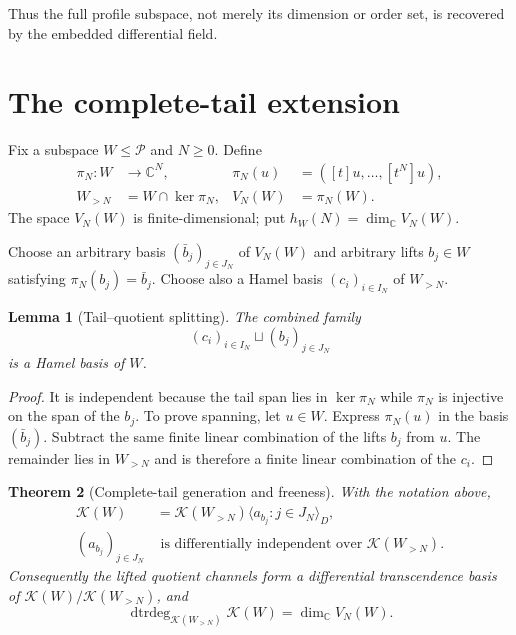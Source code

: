 \documentclass[11pt]{article}
\newtheorem{theorem}{Theorem}[section]
\newtheorem{lemma}[theorem]{Lemma}
\theoremstyle{definition}
\theoremstyle{remark}
\newcommand{\C}{\mathbb C}
\newcommand{\Pcal}{\mathcal P}
\newcommand{\K}{\mathcal K}
\newcommand{\dtrdeg}{\operatorname{dtrdeg}}
\begin{document}
Thus the full profile subspace, not merely its dimension or order set, is recovered by the embedded
differential field.

\section{The complete-tail extension}\label{sec:tail}

Fix a subspace $W\le\Pcal$ and $N\ge0$.  Define
\begin{align}
 \pi_N:W&\longrightarrow\C^N,
 &\pi_N(u)&=([t]u,\ldots,[t^N]u),                         \label{eq:prefix-map}\\
 W_{>N}&=W\cap\ker\pi_N,
 &V_N(W)&=\pi_N(W).                                      \label{eq:tail-space}
\end{align}
The space $V_N(W)$ is finite-dimensional; put $h_W(N)=\dim_\C V_N(W)$.

Choose an arbitrary basis $(\bar b_j)_{j\in J_N}$ of $V_N(W)$ and arbitrary lifts
$b_j\in W$ satisfying $\pi_N(b_j)=\bar b_j$.  Choose also a Hamel basis $(c_i)_{i\in I_N}$ of
$W_{>N}$.

\begin{lemma}[Tail--quotient splitting]\label{lem:tail-splitting}
The combined family
\begin{equation}\label{eq:combined-basis}
 (c_i)_{i\in I_N}\sqcup(b_j)_{j\in J_N}
\end{equation}
is a Hamel basis of $W$.
\end{lemma}

\begin{proof}
It is independent because the tail span lies in $\ker\pi_N$ while $\pi_N$ is injective on the
span of the $b_j$.  To prove spanning, let $u\in W$.  Express $\pi_N(u)$ in the basis
$(\bar b_j)$.  Subtract the same finite linear combination of the lifts $b_j$ from $u$.  The
remainder lies in $W_{>N}$ and is therefore a finite linear combination of the $c_i$.
\end{proof}

\begin{theorem}[Complete-tail generation and freeness]\label{thm:tail-generation}
With the notation above,
\begin{align}
 \K(W)&=\K(W_{>N})\langle a_{b_j}:j\in J_N\rangle_D,
                                                        \label{eq:tail-generation}\\
 (a_{b_j})_{j\in J_N}&\text{ is differentially independent over }\K(W_{>N}).
                                                        \label{eq:tail-relative-free}
\end{align}
Consequently the lifted quotient channels form a differential transcendence basis of
$\K(W)/\K(W_{>N})$, and
\begin{equation}\label{eq:dtrdeg}
 \dtrdeg_{\K(W_{>N})}\K(W)=\dim_\C V_N(W).
\end{equation}
\end{theorem}
\end{document}
